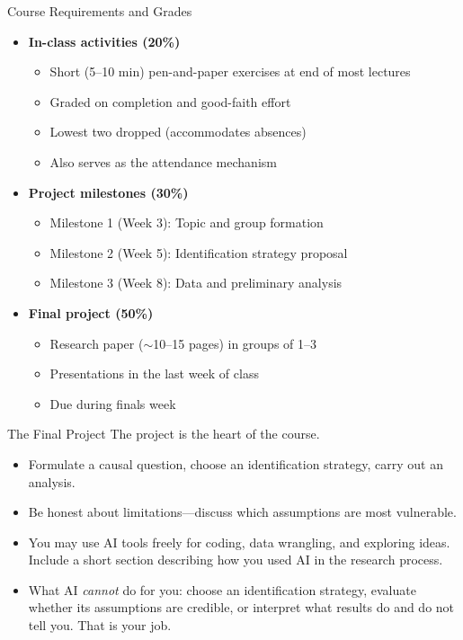 \documentclass[handout,xcolor=dvipsnames,pdftex,hyperref={colorlinks=false}]{beamer}
\newcommand\makebiggaps{\addtolength{\itemsep}{.5\baselineskip}}
\begin{document}
\begin{frame}{Course Requirements and Grades}
\begin{itemize}
\makebiggaps
\item<1-> \textbf{In-class activities (20\%)}
  \begin{itemize}
  \item Short (5--10 min) pen-and-paper exercises at end of most lectures
  \item Graded on completion and good-faith effort
  \item Lowest two dropped (accommodates absences)
  \item Also serves as the attendance mechanism
  \end{itemize}
\medskip
\item<2-> \textbf{Project milestones (30\%)}
  \begin{itemize}
  \item Milestone 1 (Week 3): Topic and group formation
  \item Milestone 2 (Week 5): Identification strategy proposal
  \item Milestone 3 (Week 8): Data and preliminary analysis
  \end{itemize}
\medskip
\item<3-> \textbf{Final project (50\%)}
  \begin{itemize}
  \item Research paper ($\sim$10--15 pages) in groups of 1--3
  \item Presentations in the last week of class
  \item Due during finals week
  \end{itemize}
\end{itemize}
\end{frame}


\begin{frame}{The Final Project}
\small
{} The project is the heart of the course.\\
\medskip
\begin{itemize}
\item<2-> Formulate a causal question, choose an identification strategy, carry out an analysis.
\medskip
\item<3-> Be honest about limitations---discuss which assumptions are most vulnerable.
\medskip
\item<4-> You may use AI tools freely for coding, data wrangling, and exploring ideas. Include a short section describing how you used AI in the research process.
\medskip
\item<5-> What AI \textit{cannot} do for you: choose an identification strategy, evaluate whether its assumptions are credible, or interpret what results do and do not tell you. That is your job.
\end{itemize}
\end{frame}
\end{document}
